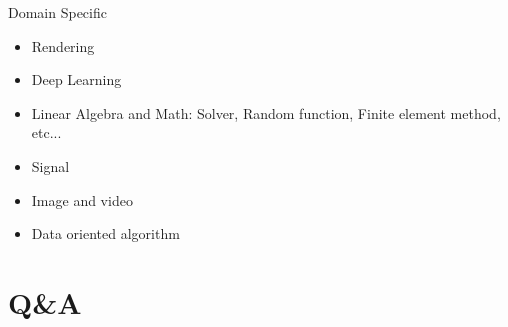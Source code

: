 \documentclass{beamer}
\begin{document}
\begin{frame}{Domain Specific}
	\begin{itemize}
		\item Rendering
		\item Deep Learning
		\item Linear Algebra and Math: Solver, Random function, Finite element method, etc...
		\item Signal
		\item Image and video
		\item Data oriented algorithm
	\end{itemize}
\end{frame}

\section{Q\&A}
\end{document}
